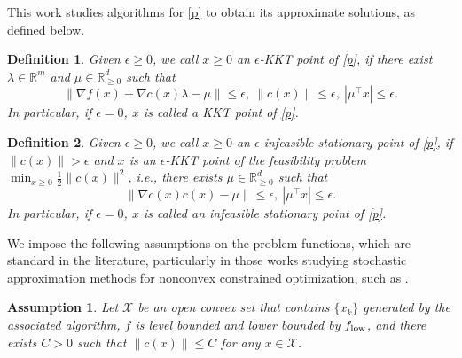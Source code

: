 \documentclass[11pt]{article}
\newtheorem{assumption}{Assumption}
\newtheorem{definition}{Definition}
\newcommand{\R}{\mathbb{R}}
\newcommand{\be}{\begin{equation}}
\newcommand{\ee}{\end{equation}}
\begin{document}
{This work studies algorithms for \eqref{p} to obtain its approximate solutions, as defined below.}

\begin{definition}\label{def-1-o}
{Given \(\epsilon \ge 0\),} we call $x\ge0$  an $\epsilon$-KKT point of \eqref{p}, if there exist $\lambda\in\R^m$ and \(\mu \in \R^d_{\ge 0}\) such that 
\be\label{FO-approx}
\|\nabla f(x) + \nabla c(x)\lambda - \mu\| \le \epsilon,~ \|c(x)\| \le \epsilon,~|\mu^\top x| \leq \epsilon.
\ee
{In particular, if \(\epsilon = 0\),  $x$ is called a KKT point of \eqref{p}.}
\end{definition}

\begin{definition}\label{def-inf-sta}
{Given \(\epsilon \ge 0\),} we call $x\ge0 $ an $\epsilon$-{infeasible} stationary point of \eqref{p}, if {\(\|c(x) \| > \epsilon\) and} \(x\) is an $\epsilon$-KKT point of the feasibility problem \(\min_{x \geq 0} \frac{1}{2}\|c(x)\|^2\), i.e., there exists \(\mu \in \R^d_{\ge 0}\) such that 
\be
\|\nabla c(x)c(x) - \mu\| \le \epsilon,  ~|\mu^\top x| \leq \epsilon.
\ee
In particular, if \(\epsilon = 0\), \(x\) is called an infeasible stationary point of \eqref{p}.
\end{definition}

We impose the following assumptions on the problem functions, which are standard in the  literature, particularly in those works studying stochastic approximation methods for  nonconvex constrained optimization, such as \cite{curtis2024sequential,curtis2024worst}.
\begin{assumption}\label{ass:bound}
Let $\mathcal X$ be an open convex set that contains {$\{x_k\}$} generated by {the associated algorithm},  $f$ is level bounded and lower bounded by $f_{\rm low}$, and there  exists  $C>0 $ such that  $\|c(x)\|\le C$ for any $x\in\mathcal X$. %
\end{assumption}
\end{document}
